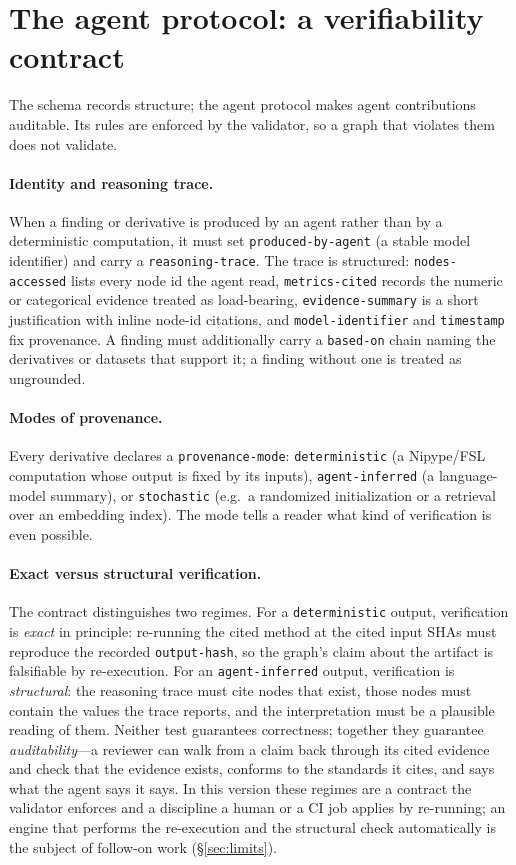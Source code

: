 \documentclass[preprint]{glimmer-paper}
\newcommand{\code}[1]{\texttt{#1}}
\newcommand{\node}[1]{\textsf{#1}}
\begin{document}
\section{The agent protocol: a verifiability contract}
\label{sec:protocol}

The schema records structure; the agent protocol makes agent contributions auditable. Its
rules are enforced by the validator, so a graph that violates them does not validate.

\paragraph{Identity and reasoning trace.} When a \node{finding} or \node{derivative} is
produced by an agent rather than by a deterministic computation, it must set
\code{produced-by-agent} (a stable model identifier) and carry a \code{reasoning-trace}.
The trace is structured: \code{nodes-accessed} lists every node id the agent read,
\code{metrics-cited} records the numeric or categorical evidence treated as load-bearing,
\code{evidence-summary} is a short justification with inline node-id citations, and
\code{model-identifier} and \code{timestamp} fix provenance. A finding must additionally
carry a \code{based-on} chain naming the derivatives or datasets that support it; a finding
without one is treated as ungrounded.

\paragraph{Modes of provenance.} Every \node{derivative} declares a \code{provenance-mode}:
\code{deterministic} (a Nipype/FSL computation whose output is fixed by its inputs),
\code{agent-inferred} (a language-model summary), or \code{stochastic} (e.g.\ a randomized
initialization or a retrieval over an embedding index). The mode tells a reader what kind
of verification is even possible.

\paragraph{Exact versus structural verification.} The contract distinguishes two regimes.
For a \code{deterministic} output, verification is \emph{exact} in principle: re-running
the cited method at the cited input SHAs must reproduce the recorded \code{output-hash}, so
the graph's claim about the artifact is falsifiable by re-execution. For an
\code{agent-inferred} output, verification is \emph{structural}: the reasoning trace must
cite nodes that exist, those nodes must contain the values the trace reports, and the
interpretation must be a plausible reading of them. Neither test guarantees correctness;
together they guarantee \emph{auditability}---a reviewer can walk from a claim back through
its cited evidence and check that the evidence exists, conforms to the standards it cites,
and says what the agent says it says. In this version these regimes are a contract the
validator enforces and a discipline a human or a CI job applies by re-running; an engine
that performs the re-execution and the structural check automatically is the subject of
follow-on work (\S\ref{sec:limits}).
\end{document}
